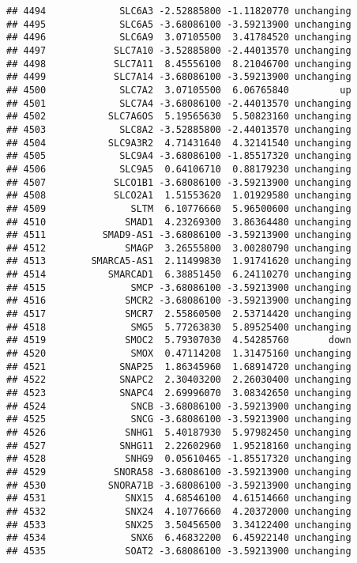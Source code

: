\documentclass[]{article}
\begin{document}
\begin{verbatim}
## 4494             SLC6A3 -2.52885800 -1.11820770 unchanging
## 4495             SLC6A5 -3.68086100 -3.59213900 unchanging
## 4496             SLC6A9  3.07105500  3.41784520 unchanging
## 4497            SLC7A10 -3.52885800 -2.44013570 unchanging
## 4498            SLC7A11  8.45556100  8.21046700 unchanging
## 4499            SLC7A14 -3.68086100 -3.59213900 unchanging
## 4500             SLC7A2  3.07105500  6.06765840         up
## 4501             SLC7A4 -3.68086100 -2.44013570 unchanging
## 4502           SLC7A6OS  5.19565630  5.50823160 unchanging
## 4503             SLC8A2 -3.52885800 -2.44013570 unchanging
## 4504           SLC9A3R2  4.71431640  4.32141540 unchanging
## 4505             SLC9A4 -3.68086100 -1.85517320 unchanging
## 4506             SLC9A5  0.64106710  0.88179230 unchanging
## 4507            SLCO1B1 -3.68086100 -3.59213900 unchanging
## 4508            SLCO2A1  1.51553620  1.01929580 unchanging
## 4509               SLTM  6.10776660  5.96500600 unchanging
## 4510              SMAD1  4.23269300  3.86364480 unchanging
## 4511          SMAD9-AS1 -3.68086100 -3.59213900 unchanging
## 4512              SMAGP  3.26555800  3.00280790 unchanging
## 4513        SMARCA5-AS1  2.11499830  1.91741620 unchanging
## 4514           SMARCAD1  6.38851450  6.24110270 unchanging
## 4515               SMCP -3.68086100 -3.59213900 unchanging
## 4516              SMCR2 -3.68086100 -3.59213900 unchanging
## 4517              SMCR7  2.55860500  2.53714420 unchanging
## 4518               SMG5  5.77263830  5.89525400 unchanging
## 4519              SMOC2  5.79307030  4.54285760       down
## 4520               SMOX  0.47114208  1.31475160 unchanging
## 4521             SNAP25  1.86345960  1.68914720 unchanging
## 4522             SNAPC2  2.30403200  2.26030400 unchanging
## 4523             SNAPC4  2.69996070  3.08342650 unchanging
## 4524               SNCB -3.68086100 -3.59213900 unchanging
## 4525               SNCG -3.68086100 -3.59213900 unchanging
## 4526              SNHG1  5.40187930  5.97982450 unchanging
## 4527             SNHG11  2.22602960  1.95218160 unchanging
## 4528              SNHG9  0.05610465 -1.85517320 unchanging
## 4529            SNORA58 -3.68086100 -3.59213900 unchanging
## 4530           SNORA71B -3.68086100 -3.59213900 unchanging
## 4531              SNX15  4.68546100  4.61514660 unchanging
## 4532              SNX24  4.10776660  4.20372000 unchanging
## 4533              SNX25  3.50456500  3.34122400 unchanging
## 4534               SNX6  6.46832200  6.45922140 unchanging
## 4535              SOAT2 -3.68086100 -3.59213900 unchanging

\end{verbatim}
\end{document}
